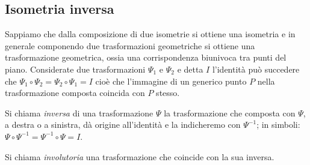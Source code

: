 \subsection{Isometria inversa}
			
Sappiamo che dalla composizione di due isometrie si ottiene una isometria e in generale componendo due trasformazioni geometriche si ottiene una trasformazione geometrica, ossia una corrispondenza biunivoca tra punti del piano.
Considerate due trasformazioni $\Psi_1$ e $\Psi_2$ e detta $I$ l'identità può succedere che $\Psi_1 \circ \Psi_2 = \Psi_2 \circ \Psi_1 = I$ cioè che l'immagine di un generico punto $P$ nella trasformazione composta coincida con $P$ stesso.
			
\begin{definizione}
Si chiama \emph{inversa} di una trasformazione $\Psi$ la trasformazione che composta con $\Psi$, a destra o a sinistra, dà origine all'identità e la indicheremo con $\Psi^{-1}$; in simboli: $\Psi \circ \Psi^{-1} = \Psi^{-1} \circ \Psi = I$.
\end{definizione}
			
\begin{definizione}
Si chiama \emph{involutoria} una trasformazione che coincide con la sua inversa.
\end{definizione}
			
